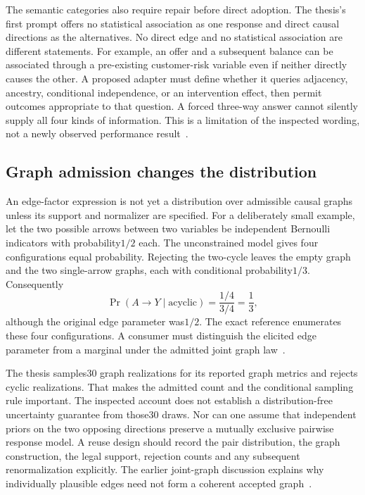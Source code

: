 The semantic categories also require repair before direct adoption. The thesis's first prompt offers no statistical association as one response and direct causal directions as the alternatives. No direct edge and no statistical association are different statements. For example, an offer and a subsequent balance can be associated through a pre-existing customer-risk variable even if neither directly causes the other. A proposed adapter must define whether it queries adjacency, ancestry, conditional independence, or an intervention effect, then permit outcomes appropriate to that question. A forced three-way answer cannot silently supply all four kinds of information. This is a limitation of the inspected wording, not a newly observed performance result~\citep{exec18_videira_thesis}.

\subsection{Graph admission changes the distribution}
An edge-factor expression is not yet a distribution over admissible causal graphs unless its support and normalizer are specified. For a deliberately small example, let the two possible arrows between two variables be independent Bernoulli indicators with probability$1/2$ each. The unconstrained model gives four configurations equal probability. Rejecting the two-cycle leaves the empty graph and the two single-arrow graphs, each with conditional probability$1/3$. Consequently
\begin{equation}
 \Pr(A\to Y\mid\text{acyclic})=\frac{1/4}{3/4}=\frac13,
 \label{exec18:dag-conditioning}
\end{equation}
although the original edge parameter was$1/2$. The exact reference enumerates these four configurations. A consumer must distinguish the elicited edge parameter from a marginal under the admitted joint graph law~\citep{exec18_bayesian_reference}.

The thesis samples30 graph realizations for its reported graph metrics and rejects cyclic realizations. That makes the admitted count and the conditional sampling rule important. The inspected account does not establish a distribution-free uncertainty guarantee from those30 draws. Nor can one assume that independent priors on the two opposing directions preserve a mutually exclusive pairwise response model. A reuse design should record the pair distribution, the graph construction, the legal support, rejection counts and any subsequent renormalization explicitly. The earlier joint-graph discussion explains why individually plausible edges need not form a coherent accepted graph~\citep{exec18_videira_thesis}.

